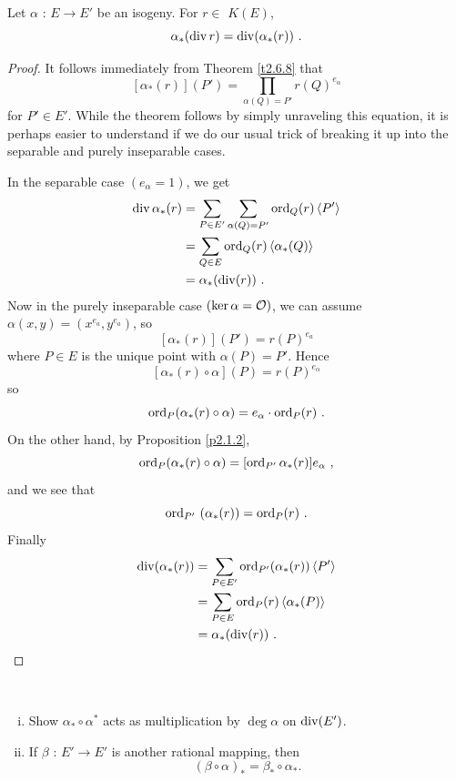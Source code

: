 \begin{theo}
\label{t2.6.9}
Let $\alpha$ : $E\rightarrow E'$ be an isogeny. For $ r\in$ $K(E)$,
$$
\alpha_{*}(\on{div}r)=\on{div}(\alpha_{*}(r))\ .
$$
\end{theo}

\begin{proof}
It follows immediately from Theorem \ref{t2.6.8} that
$$
[\alpha_{*}(r)](P')=\prod_{\alpha(Q)=P'}r(Q)^{e_{\alpha}}
$$
for $P'\in E'$. While the theorem follows by simply unraveling this equation, it is perhaps easier to understand if we do our usual trick of breaking it up into the separable and purely inseparable cases.

In the separable case $(e_{\alpha}=1)$, we get
\begin{align*}
\operatorname{div}{\alpha_{*}(r)}&=\sum_{P\in E'} \sum_{\alpha(Q)=P'}\operatorname{ord}_{Q}(r)\left\langle P' \right \rangle\\
&=\sum_{Q\in E}\operatorname{ord}_{Q}(r) \left\langle \alpha_{*}(Q) \right \rangle\\
&=\alpha_{*}(\operatorname{div}(r))\ .
\end{align*}
Now in the purely inseparable case $(\ker \alpha =\mathcal{O})$, we can assume $\alpha(x, y)= (x^{e_{a}}, y^{e_{a}})$, so
$$
[\alpha_{*}(r)](P')=r(P)^{e_{a}}
$$
where $P\in E$ is the unique point with $\alpha(P)=P'$. Hence
$$
[\alpha_{*}(r)\circ\alpha](P)=r(P)^{e_{\alpha}}
$$
so
$$
\operatorname{ord}_{P}(\alpha_{*}(r)\circ\alpha)=e_{\alpha}\cdot \operatorname{ord}_{P}(r)\ .
$$
On the other hand, by Proposition \ref{p2.1.2},
$$
\ord{P}(\alpha_{*}(r)\circ\alpha)=[\ord{P'}\alpha_{*}(r)]e_{\alpha}\ ,
$$
and we see that
$$
\ord{P'}\ (\alpha_{*}(r))=\ord{P}(r)\ .
$$
Finally
\begin{align*}
\operatorname{div}(\alpha_{*}(r))&=\sum_{P\in E'}\operatorname{ord}_{P'}(\alpha_{*}(r))\left\langle P' \right \rangle\\
&=\sum_{P\in E}\operatorname{ord}_{P}(r)\left\langle \alpha_{*}(P) \right \rangle\\
&=\alpha_{*}(\operatorname{div}(r))\ .
\end{align*}
\end{proof}

\begin{exo}
\label{e2.6.8}
~
\begin{enumerate}[(i)]
\item
Show $\alpha_{*}\circ\alpha^{*}$ acts as multiplication by $\deg\alpha$ on $\operatorname{div}(E')$.
\item
If $\beta$ : $E'\rightarrow E'$ is another rational mapping, then
$$(\beta\circ\alpha)_{*}=\beta_{*}\circ\alpha_{*}.$$
\end{enumerate}
\end{exo}

